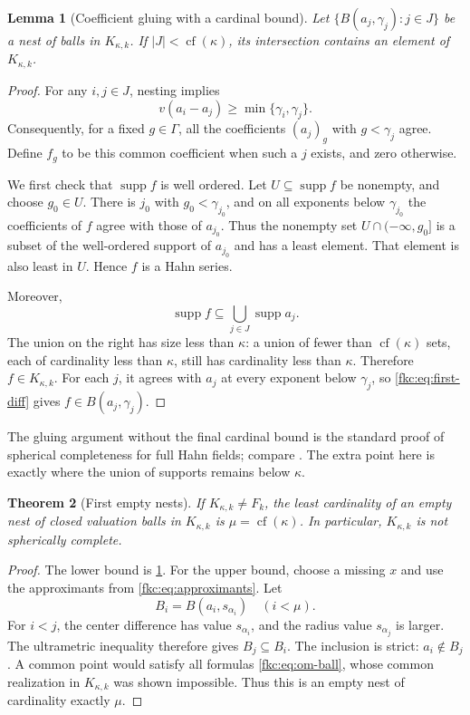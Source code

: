 \documentclass[11pt,letterpaper]{article}
\numberwithin{equation}{section}
\newtheorem{theorem}{Theorem}[section]
\newtheorem{lemma}[theorem]{Lemma}
\theoremstyle{definition}
\theoremstyle{remark}
\newcommand{\supp}{\operatorname{supp}}
\newcommand{\cf}{\operatorname{cf}}
\newcommand{\K}{K_{\kappa,k}}
\begin{document}
\begin{lemma}[Coefficient gluing with a cardinal bound]\label{fkc:lem:glue}
Let $\{B(a_j,\gamma_j):j\in J\}$ be a nest of balls in $\K$. If $|J|<\cf(\kappa)$, its intersection contains an element of $\K$.
\end{lemma}
\begin{proof}
For any $i,j\in J$, nesting implies
\[
 v(a_i-a_j)\ge\min\{\gamma_i,\gamma_j\}.
\]
Consequently, for a fixed $g\in\Gamma$, all the coefficients $(a_j)_g$ with $g<\gamma_j$ agree. Define $f_g$ to be this common coefficient when such a $j$ exists, and zero otherwise.

We first check that $\supp f$ is well ordered. Let $U\subseteq\supp f$ be nonempty, and choose $g_0\in U$. There is $j_0$ with $g_0<\gamma_{j_0}$, and on all exponents below $\gamma_{j_0}$ the coefficients of $f$ agree with those of $a_{j_0}$. Thus the nonempty set $U\cap(-\infty,g_0]$ is a subset of the well-ordered support of $a_{j_0}$ and has a least element. That element is also least in $U$. Hence $f$ is a Hahn series.

Moreover,
\[
 \supp f\subseteq\bigcup_{j\in J}\supp a_j.
\]
The union on the right has size less than $\kappa$: a union of fewer than $\cf(\kappa)$ sets, each of cardinality less than $\kappa$, still has cardinality less than $\kappa$. Therefore $f\in\K$. For each $j$, it agrees with $a_j$ at every exponent below $\gamma_j$, so \eqref{fkc:eq:first-diff} gives $f\in B(a_j,\gamma_j)$.
\end{proof}

The gluing argument without the final cardinal bound is the standard proof of spherical completeness for full Hahn fields; compare \cite[Lemma~4]{Poonen}. The extra point here is exactly where the union of supports remains below $\kappa$.

\begin{theorem}[First empty nests]\label{fkc:thm:balls}
If $\K\ne F_k$, the least cardinality of an empty nest of closed valuation balls in $\K$ is $\mu=\cf(\kappa)$. In particular, $\K$ is not spherically complete.
\end{theorem}
\begin{proof}
The lower bound is \cref{fkc:lem:glue}. For the upper bound, choose a missing $x$ and use the approximants from \eqref{fkc:eq:approximants}. Let
\[
 B_i=B(a_i,s_{\alpha_i})\quad(i<\mu).
\]
For $i<j$, the center difference has value $s_{\alpha_i}$, and the radius value $s_{\alpha_j}$ is larger. The ultrametric inequality therefore gives $B_j\subseteq B_i$. The inclusion is strict: $a_i\notin B_j$. A common point would satisfy all formulas \eqref{fkc:eq:om-ball}, whose common realization in $\K$ was shown impossible. Thus this is an empty nest of cardinality exactly $\mu$.
\end{proof}
\end{document}

